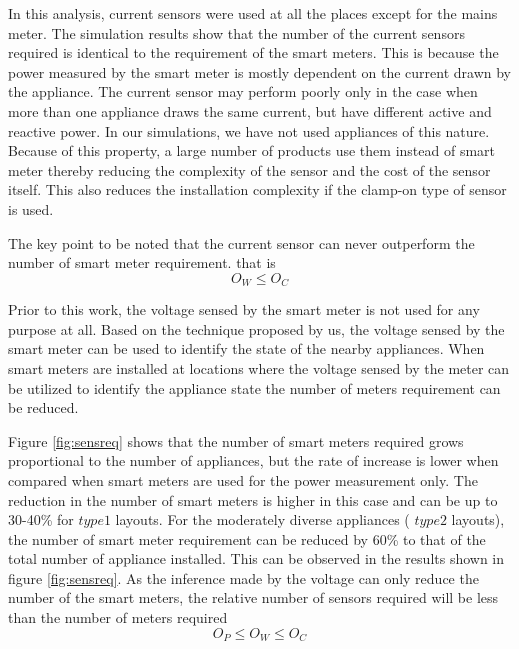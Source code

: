 In this analysis, current sensors were used at all the places except for the mains meter. The simulation results show that the number of the current sensors required is identical to the requirement of the smart meters. This is because the power measured by the smart meter is mostly dependent on the current drawn by the appliance. The current sensor may perform poorly only in the case when more than one appliance draws the same current, but have different active and reactive power. In our simulations, we have not used appliances of this nature. Because of this property, a large number of products use them instead of smart meter thereby reducing the complexity of the sensor and the cost of the sensor itself. This also reduces the installation complexity if the clamp-on type of sensor is used.

The key point to be noted that the current sensor can never outperform the number of smart meter requirement.
that is $$O_W \le O_C$$

Prior to this work, the voltage sensed by the smart meter is not used for any purpose at all. Based on the technique proposed by us, the voltage sensed by the smart meter can be used to identify the state of the nearby appliances. When smart meters are installed at locations where the voltage sensed by the meter can be utilized to identify the appliance state the number of meters requirement can be reduced.

Figure \ref{fig:sensreq} shows that the number of smart meters required grows proportional to the number of appliances, but the rate of increase is lower when compared when smart meters are used for the power measurement only. The reduction in the number of smart meters is higher in this case and can be up to 30-40\% for $type 1$ layouts. For the moderately diverse appliances ( $type 2$ layouts), the number of smart meter requirement can be reduced by 60\% to that of the total number of appliance installed.  This can be observed in the results shown in figure \ref{fig:sensreq}. As the inference made by the  voltage can only reduce the number of the smart meters, the relative number of sensors required will be less than the number of meters required $$O_P \le  O_W \le  O_C$$
